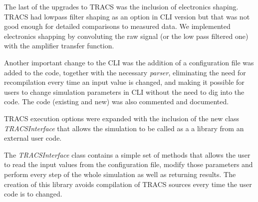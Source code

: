 The last of the upgrades to TRACS was the inclusion of electronics shaping. TRACS had lowpass filter shaping as an option in CLI version but that was not good enough for detailed comparisons to measured data. We implemented electronics shapping by convoluting the raw signal (or the low pass filtered one) with the amplifier transfer function. %



Another important change to the CLI was the addition of a configuration file was added to the code, together with the necessary \textit{parser}, eliminating the need for recompilation every time an input value is changed, and making it possible for users to change simulation parameters in CLI without the need to dig into the code. The code (existing and new) was also commented and documented.

TRACS execution options were expanded with the inclusion of the new class \emph{TRACSInterface} that allows the simulation to be called as a a library from an external user code.


The \textit{TRACSInterface} class contains a simple set of methods that allows the user to read the input values from the configuration file, modify those parameters and perform every step of the whole simulation as well as returning results. The creation of this library avoids compilation of TRACS sources every time the user code is to changed.

